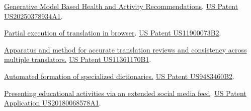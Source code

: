 
\href{https://patents.google.com/patent/US20250378934A1}{Generative Model Based Health and Activity Recommendations}. \hypersetup{urlcolor=black}\href{https://patents.google.com/patent/US20250378934A1}{US Patent US20250378934A1}\hypersetup{urlcolor=linkcol}. %

\href{https://patents.google.com/patent/US11900073B2}{Partial execution of translation in browser}. \hypersetup{urlcolor=black}\href{https://patents.google.com/patent/US11900073B2}{US Patent US11900073B2}\hypersetup{urlcolor=linkcol}. %

{\small \href{https://patents.google.com/patent/US11361170B1}{Apparatus and method for accurate translation reviews and consistency across multiple translators.} \hypersetup{urlcolor=black}\href{https://patents.google.com/patent/US11361170B1}{US Patent US11361170B1}\hypersetup{urlcolor=linkcol}. } %

\href{https://patents.google.com/patent/US9483460B2}{Automated formation of specialized dictionaries.} \hypersetup{urlcolor=black}\href{https://patents.google.com/patent/US9483460B2}{US Patent US9483460B2}\hypersetup{urlcolor=linkcol}. %

\href{https://patents.google.com/patent/US20180068578A1}{Presenting educational activities via an extended social media feed}. \hypersetup{urlcolor=black}\href{https://patents.google.com/patent/US20180068578A1}{US Patent Application US20180068578A1}\hypersetup{urlcolor=linkcol}. %